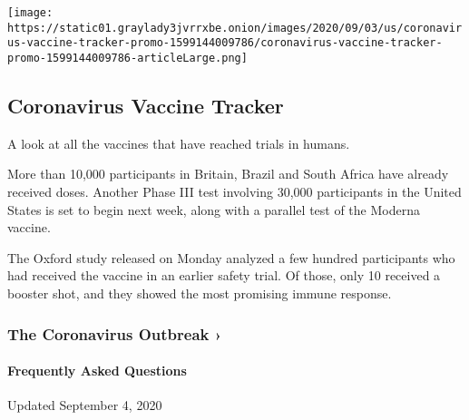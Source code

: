 \href{https://www.nytimes3xbfgragh.onion/interactive/2020/science/coronavirus-vaccine-tracker.html}{}

\texttt{[image: https://static01.graylady3jvrrxbe.onion/images/2020/09/03/us/coronavirus-vaccine-tracker-promo-1599144009786/coronavirus-vaccine-tracker-promo-1599144009786-articleLarge.png]}

\hypertarget{coronavirus-vaccine-tracker}{%
\subsection{Coronavirus Vaccine
Tracker}\label{coronavirus-vaccine-tracker}}

A look at all the vaccines that have reached trials in humans.

More than 10,000 participants in Britain, Brazil and South Africa have
already received doses. Another Phase III test involving 30,000
participants in the United States is set to begin next week, along with
a parallel test of the Moderna vaccine.

The Oxford study released on Monday analyzed a few hundred participants
who had received the vaccine in an earlier safety trial. Of those, only
10 received a booster shot, and they showed the most promising immune
response.

\href{https://www.nytimes3xbfgragh.onion/news-event/coronavirus?action=click\&pgtype=Article\&state=default\&region=MAIN_CONTENT_3\&context=storylines_faq}{}

\hypertarget{the-coronavirus-outbreak-}{%
\subsubsection{The Coronavirus Outbreak
›}\label{the-coronavirus-outbreak-}}

\hypertarget{frequently-asked-questions}{%
\paragraph{Frequently Asked
Questions}\label{frequently-asked-questions}}

Updated September 4, 2020

